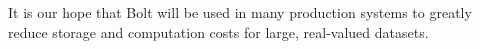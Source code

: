 \documentclass[sigconf]{acmart}  %
\begin{document}
It is our hope that Bolt will be used in many production systems to greatly reduce storage and computation costs for large, real-valued datasets.


\vspace{-1mm}



% 

\end{document}
